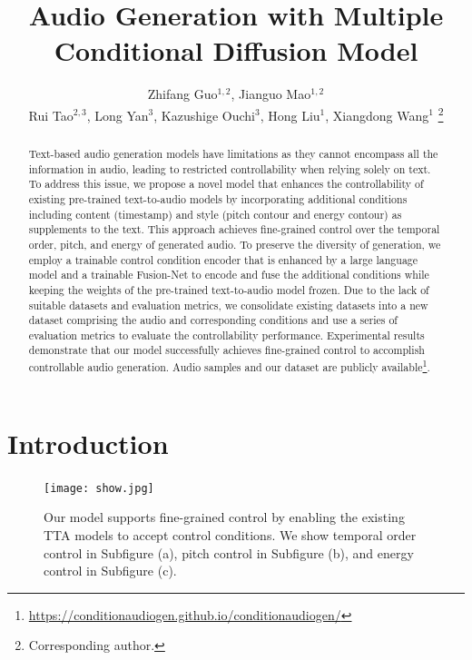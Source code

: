 \documentclass[letterpaper]{article} %
\title{Audio Generation with Multiple Conditional Diffusion Model}
\author {
    Zhifang Guo$^{1,2}$,
    Jianguo Mao$^{1,2}$ \\
    Rui Tao$^{2,3}$,
    Long Yan$^{3}$,
    Kazushige Ouchi$^{3}$,
    Hong Liu$^{1}$,
    Xiangdong Wang$^{1}$
    \thanks{Corresponding author.}
}
\begin{document}
\maketitle

\begin{abstract}

Text-based audio generation models have limitations as they cannot encompass all the information in audio, leading to restricted controllability when relying solely on text. To address this issue, we propose a novel model that enhances the controllability of existing pre-trained text-to-audio models by incorporating additional conditions including content (timestamp) and style (pitch contour and energy contour) as supplements to the text. This approach achieves fine-grained control over the temporal order, pitch, and energy of generated audio. To preserve the diversity of generation, we employ a trainable control condition encoder that is enhanced by a large language model and a trainable Fusion-Net to encode and fuse the additional conditions while keeping the weights of the pre-trained text-to-audio model frozen. Due to the lack of suitable datasets and evaluation metrics, we consolidate existing datasets into a new dataset comprising the audio and corresponding conditions and use a series of evaluation metrics to evaluate the controllability performance. Experimental results demonstrate that our model successfully achieves fine-grained control to accomplish controllable audio generation. Audio samples and our dataset are publicly available\footnote{\url{https://conditionaudiogen.github.io/conditionaudiogen/}}.

\end{abstract}

\section{Introduction}

\begin{figure}[!t]
    \centering
    \texttt{[image: show.jpg]}
    \caption{Our model supports fine-grained control by enabling the existing TTA models to accept control conditions. We show temporal order control in Subfigure (a), pitch control in Subfigure (b), and energy control in Subfigure (c).}
    \label{show}
\end{figure}
\end{document}
